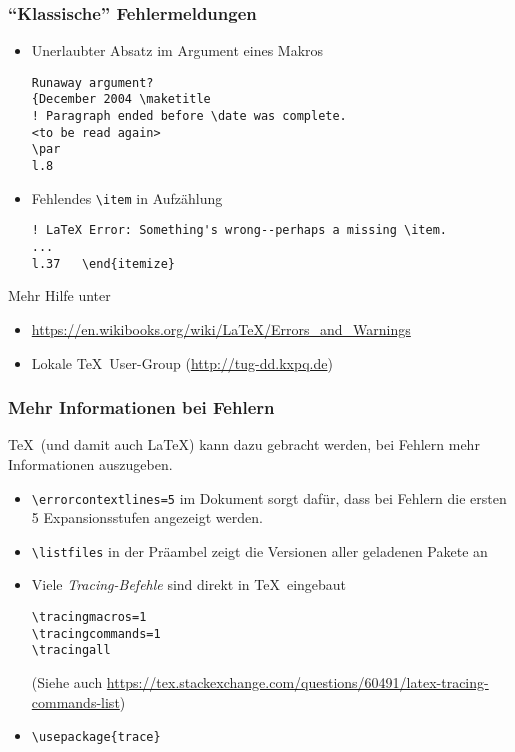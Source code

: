 \begin{frame}[fragile]
  \frametitle{\enquote{Klassische} Fehlermeldungen}
  \onslide<+->

  \begin{itemize}
  \item<+-> Unerlaubter Absatz im Argument eines Makros

\begin{verbatim}
Runaway argument?
{December 2004 \maketitle
! Paragraph ended before \date was complete.
<to be read again>
\par
l.8
\end{verbatim}

  \item<+-> Fehlendes \lstinline|\item| in Aufzählung

\begin{verbatim}
! LaTeX Error: Something's wrong--perhaps a missing \item.
...
l.37   \end{itemize}
\end{verbatim}
  \end{itemize}

  \onslide<+->

  Mehr Hilfe unter
  \begin{itemize}
  \item<+-> \url{https://en.wikibooks.org/wiki/LaTeX/Errors_and_Warnings}
  \item<+-> Lokale \TeX\ User-Group (\url{http://tug-dd.kxpq.de})
  \end{itemize}

\end{frame}

\begin{frame}[fragile]
  \frametitle{Mehr Informationen bei Fehlern}

  \onslide<+->

  \TeX\ (und damit auch \LaTeX) kann dazu gebracht werden, bei Fehlern mehr
  Informationen auszugeben.

  \begin{itemize}
  \item<+-> \lstinline|\errorcontextlines=5| im Dokument sorgt dafür, dass bei
    Fehlern die ersten 5 Expansionsstufen angezeigt werden.
  \item<+-> \lstinline|\listfiles| in der Präambel zeigt die Versionen aller
    geladenen Pakete an
  \item<+-> Viele \emph{Tracing-Befehle} sind direkt in \TeX\ eingebaut
\begin{lstlisting}
\tracingmacros=1
\tracingcommands=1
\tracingall
\end{lstlisting}
    (Siehe auch
    \url{https://tex.stackexchange.com/questions/60491/latex-tracing-commands-list})
  \item<+-> \lstinline|\usepackage{trace}|
  \end{itemize}

\end{frame}




